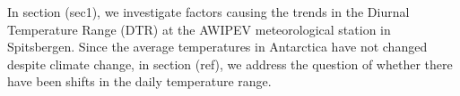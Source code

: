 In section (sec1), we investigate factors causing the trends in the Diurnal Temperature Range (DTR) at the AWIPEV meteorological station in Spitsbergen. Since the average temperatures in Antarctica have not changed despite climate change, in section (ref), we address the question of whether there have been shifts in the daily temperature range.



